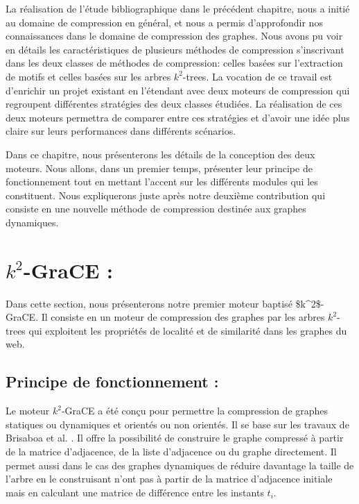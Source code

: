 \documentclass[a4paper,oneside,12pt]{report}
\theoremstyle{definition}
\begin{document}
	La réalisation de l'étude bibliographique dans le précédent chapitre, nous a initié au domaine de compression en général, et nous a permis d'approfondir nos connaissances dans le domaine de compression des graphes. Nous avons pu voir en détails les caractéristiques de plusieurs méthodes de compression s'inscrivant dans les deux classes de méthodes de compression: celles basées sur l'extraction de motifs et celles basées sur les arbres $k^2$-trees. La vocation de ce travail est d'enrichir un projet existant en l'étendant avec deux moteurs de compression qui regroupent différentes stratégies des deux classes étudiées. La réalisation de ces deux moteurs permettra de comparer entre ces stratégies et d'avoir une idée plus claire sur leurs performances dans différents scénarios.
	
	Dans ce chapitre, nous présenterons les détails de la conception des deux moteurs. Nous allons, dans un premier temps, présenter leur principe de fonctionnement tout en mettant l'accent sur les différents modules qui les constituent. Nous expliquerons juste après notre deuxième contribution qui consiste en une nouvelle  méthode de compression destinée aux graphes dynamiques.
	

	\section{$k^2$-GraCE : }
	\label{k2}

Dans cette section, nous présenterons  notre premier moteur baptisé \gls{$k^2$-GraCE}. Il consiste en un moteur de compression des graphes par les arbres $k^2$-trees qui exploitent les propriétés de localité et de similarité dans les graphes du web. 

		\subsection{Principe de fonctionnement :}
		
	Le moteur $k^2$-GraCE a été conçu pour permettre la compression de graphes statiques ou dynamiques et orientés ou non orientés. Il se base sur les travaux de Brisaboa et al. \citep{brisaboa2009k}. Il offre la possibilité de construire le graphe compressé à partir de la matrice d'adjacence, de la liste d'adjacence ou du graphe directement. Il permet aussi dans le cas des graphes dynamiques de réduire davantage la taille de l'arbre en le construisant n'ont pas à partir de la matrice d'adjacence initiale mais en calculant une matrice de différence entre les instants $t_i$. 
	
\end{document}
